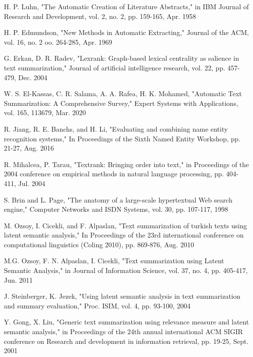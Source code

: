 \documentclass[conference]{IEEEtran}
\begin{document}
\begin{thebibliography}{00}
 H. P. Luhn, "The Automatic Creation of Literature Abstracts," in IBM Journal of Research and Development, vol. 2, no. 2, pp. 159-165, Apr. 1958

 H. P. Edmundson, "New Methods in Automatic Extracting," Journal of the ACM, vol. 16, no. 2 oo. 264-285, Apr. 1969

 G. Erkan, D. R. Radev, "Lexrank: Graph-based lexical centrality as salience in text summarization," Journal of artificial intelligence research, vol. 22, pp. 457-479, Dec. 2004

 W. S. El-Kassas, C. R. Salama, A. A. Rafea, H. K. Mohamed, "Automatic Text Summarization: A Comprehensive Survey," Expert Systems with Applications, vol. 165, 113679, Mar. 2020

 R. Jiang, R. E. Banchs, and H. Li, "Evaluating and combining name entity recognition systems," In Proceedings of the Sixth Named Entity Workshop, pp. 21-27, Aug. 2016

 R. Mihalcea, P. Tarau, "Textrank: Bringing order into text," in Proceedings of the 2004 conference on empirical methods in natural language processing, pp. 404-411, Jul. 2004

 S. Brin and L. Page, "The anatomy of a large-scale hypertextual Web search engine," Computer Networks and ISDN
Systems, vol. 30, pp. 107-117, 1998

 M. Ozsoy, I. Cicekli, and F. Alpaslan, "Text summarization of turkish texts using latent semantic analysis," In Proceedings of the 23rd international conference on computational linguistics (Coling 2010), pp. 869-876, Aug. 2010

 M.G. Ozsoy, F. N. Alpaslan, I. Cicekli, "Text summarization using Latent Semantic Analysis," in Journal of Information Science, vol. 37, no. 4, pp. 405-417, Jun. 2011

 J. Steinberger, K. Jezek, "Using latent semantic analysis in text summarization and summary evaluation," Proc. ISIM, vol. 4, pp. 93-100, 2004

 Y. Gong, X. Liu, "Generic text summarization using relevance measure and latent semantic analysis," in Proceedings of the 24th annual international ACM SIGIR conference on Research and development in information retrieval, pp. 19-25, Sept. 2001


\end{thebibliography}
\end{document}
